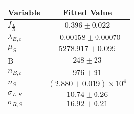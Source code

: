 \begin{tabular}[t]{lc}
\hline
Variable &Fitted Value\\
\hline\hline
$f_{\frac{L}{R}}$&$0.396\pm0.022$\\
\hline
$\lambda_{B,c}$&$-0.00158\pm0.00070$\\
\hline
$\mu_S$&$5278.917\pm0.099$\\
\hline
B&$248\pm23$\\
\hline
$n_{B,c}$&$976\pm91$\\
\hline
$n_S$&$(2.880\pm0.019)\times 10^4$\\
\hline
$\sigma_{L, S}$&$10.74\pm0.26$\\
\hline
$\sigma_{R, S}$&$16.92\pm0.21$\\
\hline
\end{tabular}